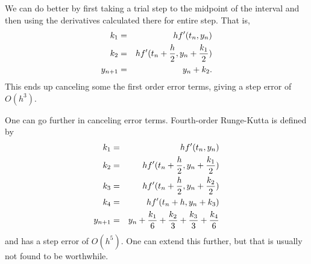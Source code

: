 \documentclass[12pt]{article}
\begin{document}
We can do better by first taking a trial step to the midpoint
of the interval and then using the derivatives calculated there
for entire step.  That is,
\begin{eqnarray}
  k_1 &=& h f'(t_n, y_n) \\
  k_2 &=& h f'(t_n + {h\over2}, y_n + {k_1\over2}) \\
  y_{n+1} &=& y_n + k_2.
\end{eqnarray}
This ends up canceling some the first order error terms, giving
a step error of $O(h^3)$.

One can go further in canceling error terms.  Fourth-order Runge-Kutta
is defined by 
\begin{eqnarray}
  k_1 &=& h f'(t_n, y_n) \\
  k_2 &=& h f'(t_n + {h\over2}, y_n + {k_1\over2}) \\
  k_3 &=& h f'(t_n + {h\over2}, y_n + {k_2\over2}) \\
  k_4 &=& h f'(t_n + h, y_n + k_3) \\
  y_{n+1} &=& y_n + {k_1\over6} + {k_2\over3} + {k_3\over3} + {k_4\over6}
\end{eqnarray}
and has a step error of $O(h^5)$.  One can extend this further,
but that is usually not found to be worthwhile.
\end{document}
